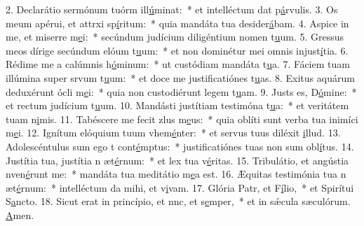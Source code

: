 2. Declarátio sermónum tuórm ill\uline{ú}minat:~* et intelléctum dat p\uline{á}rvulis.
3. Os meum apérui, et attrxi sp\uline{í}ritum:~* quia mandáta tua desider\uline{á}bam.
4. Aspice in me, et miserre m\uline{e}i:~* secúndum judícium diligéntium nomen t\uline{u}um.
5. Gressus meos dírige secúndum elóum t\uline{u}um:~* et non dominétur mei omnis injust\uline{í}tia.
6. Rédime me a calúmnis h\uline{ó}minum:~* ut custódiam mandáta t\uline{u}a.
7. Fáciem tuam illúmina super srvum t\uline{u}um:~* et doce me justificatiónes t\uline{u}as.
8. Exitus aquárum deduxérunt ócli m\uline{e}i:~* quia non custodiérunt legem t\uline{u}am.
9. Justs es, D\uline{ó}mine:~* et rectum judícium t\uline{u}um.
10. Mandásti justítiam testimóna t\uline{u}a:~* et veritátem tuam n\uline{i}mis.
11. Tabéscere me fecit zlus m\uline{e}us:~* quia oblíti sunt verba tua inimíci m\uline{e}i.
12. Ignítum elóquium tuum vhem\uline{é}nter:~* et servus tuus diléxit \uline{i}llud.
13. Adolescéntulus sum ego t cont\uline{é}mptus:~* justificatiónes tuas non sum obl\uline{í}tus.
14. Justítia tua, justítia n æt\uline{é}rnum:~* et lex tua v\uline{é}ritas.
15. Tribulátio, et angústia nven\uline{é}runt me:~* mandáta tua meditátio m\uline{e}a est.
16. Æquitas testimónia tua n æt\uline{é}rnum:~* intelléctum da mihi, et v\uline{i}vam.
17. Glória Patr, et F\uline{í}lio,~* et Spirítui S\uline{a}ncto.
18. Sicut erat in princípio, et nnc, et s\uline{e}mper,~* et in sǽcula sæculórum. \uline{A}men.
